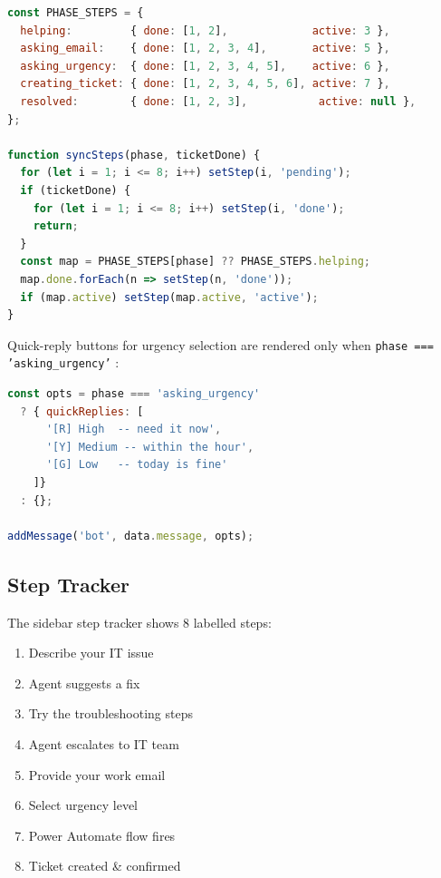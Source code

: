 \documentclass[12pt, a4paper]{article}
\newcommand{\inlinecode}[1]{%
  \colorbox{inlinecode!20}{\texttt{\small #1}}%
}
\begin{document}
\begin{lstlisting}[language=JavaScript, caption={Phase map and step synchronisation}]
const PHASE_STEPS = {
  helping:         { done: [1, 2],             active: 3 },
  asking_email:    { done: [1, 2, 3, 4],       active: 5 },
  asking_urgency:  { done: [1, 2, 3, 4, 5],    active: 6 },
  creating_ticket: { done: [1, 2, 3, 4, 5, 6], active: 7 },
  resolved:        { done: [1, 2, 3],           active: null },
};

function syncSteps(phase, ticketDone) {
  for (let i = 1; i <= 8; i++) setStep(i, 'pending');
  if (ticketDone) {
    for (let i = 1; i <= 8; i++) setStep(i, 'done');
    return;
  }
  const map = PHASE_STEPS[phase] ?? PHASE_STEPS.helping;
  map.done.forEach(n => setStep(n, 'done'));
  if (map.active) setStep(map.active, 'active');
}
\end{lstlisting}

Quick-reply buttons for urgency selection are rendered only when
\inlinecode{phase === 'asking\_urgency'}:

\begin{lstlisting}[language=JavaScript, caption={Conditional quick-reply rendering}]
const opts = phase === 'asking_urgency'
  ? { quickReplies: [
      '[R] High  -- need it now',
      '[Y] Medium -- within the hour',
      '[G] Low   -- today is fine'
    ]}
  : {};

addMessage('bot', data.message, opts);
\end{lstlisting}

\subsection{Step Tracker}

The sidebar step tracker shows 8 labelled steps:

\begin{enumerate}[leftmargin=*, label=\arabic*., itemsep=2pt]
  \item Describe your IT issue
  \item Agent suggests a fix
  \item Try the troubleshooting steps
  \item Agent escalates to IT team
  \item Provide your work email
  \item Select urgency level
  \item Power Automate flow fires
  \item Ticket created \& confirmed
\end{enumerate}
\end{document}
